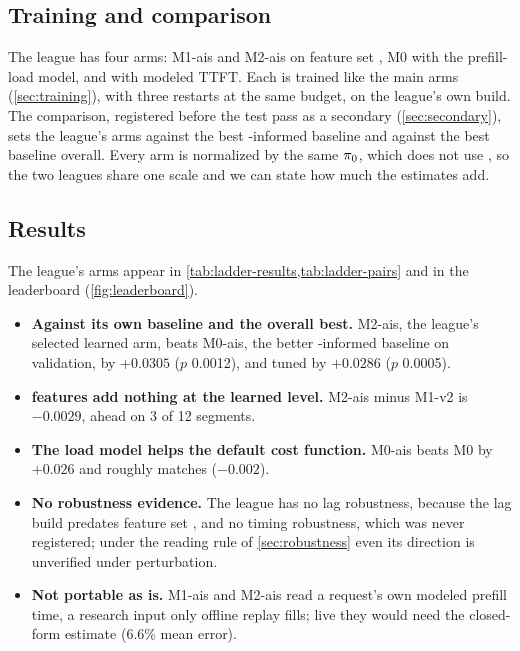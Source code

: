 \subsection{Training and comparison}

The league has four arms: M1-ais and M2-ais on feature set , M0 with the \ais{}
prefill-load model, and  with modeled TTFT. Each is trained like
the main arms (\cref{sec:training}), with three restarts at the same budget, on the league's own
build. The comparison, registered before the test pass as a secondary (\cref{sec:secondary}), sets
the league's arms against the best \ais{}-informed baseline and against the best baseline
overall. Every arm is normalized by the same $\pi_{0}$, which does not use \ais{}, so the two leagues
share one scale and we can state how much the \ais{} estimates add.

\subsection{Results}

The league's arms appear in \cref{tab:ladder-results,tab:ladder-pairs} and in the leaderboard
(\cref{fig:leaderboard}).
\begin{itemize}
  \item \textbf{Against its own baseline and the overall best.} M2-ais, the league's selected
    learned arm, beats M0-ais, the better \ais{}-informed baseline on validation, by $+0.0305$
    ($p$ 0.0012), and tuned  by $+0.0286$ ($p$ 0.0005).
  \item \textbf{\ais{} features add nothing at the learned level.} M2-ais minus M1-v2 is $-0.0029$,
    ahead on 3 of 12 segments.
  \item \textbf{The \ais{} load model helps the default cost function.} M0-ais beats M0 by $+0.026$
    and roughly matches  ($-0.002$).
  \item \textbf{No robustness evidence.} The league has no lag robustness, because the lag build
    predates feature set , and no timing robustness, which was never registered; under the
    reading rule of \cref{sec:robustness} even its direction is unverified under perturbation.
  \item \textbf{Not portable as is.} M1-ais and M2-ais read a request's own modeled prefill time, a
    research input only offline replay fills; live they would need the closed-form estimate (6.6\%
    mean error).
\end{itemize}
